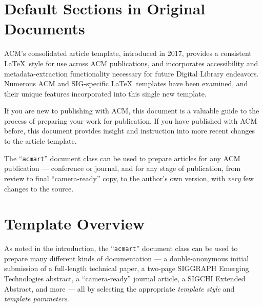 \documentclass[sigplan,screen]{acmart}
\begin{document}
\begin{table}[H]
\centering
\caption{Attributes, Data Types, and Descriptions for Nodes}
\label{tab:nodes-attributes}
\end{table}

\iffalse

\newpage

\section{Default Sections in Original Documents}

ACM's consolidated article template, introduced in 2017, provides a
consistent \LaTeX\ style for use across ACM publications, and
incorporates accessibility and metadata-extraction functionality
necessary for future Digital Library endeavors. Numerous ACM and
SIG-specific \LaTeX\ templates have been examined, and their unique
features incorporated into this single new template.

If you are new to publishing with ACM, this document is a valuable
guide to the process of preparing your work for publication. If you
have published with ACM before, this document provides insight and
instruction into more recent changes to the article template.

The ``\verb|acmart|'' document class can be used to prepare articles
for any ACM publication --- conference or journal, and for any stage
of publication, from review to final ``camera-ready'' copy, to the
author's own version, with {\itshape very} few changes to the source.

\section{Template Overview}
As noted in the introduction, the ``\verb|acmart|'' document class can
be used to prepare many different kinds of documentation --- a
double-anonymous initial submission of a full-length technical paper, a
two-page SIGGRAPH Emerging Technologies abstract, a ``camera-ready''
journal article, a SIGCHI Extended Abstract, and more --- all by
selecting the appropriate {\itshape template style} and {\itshape
  template parameters}.
\end{document}
